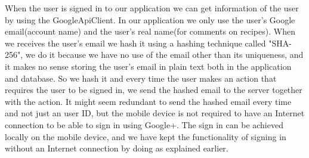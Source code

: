 When the user is signed in to our application we can get information of the user by using the GoogleApiClient.
In our application we only use the user's Google email(account name) and the user's real name(for comments on recipes). 
When we receives the user's email we hash it using a hashing technique called "SHA-256", we do it because we have no use of the email other than its uniqueness, and it makes no sense storing the user's email in plain text both in the application and database. 
So we hash it and every time the user makes an action that requires the user to be signed in, we send the hashed email to the server together with the action. 
It might seem redundant to send the hashed email every time and not just an user ID, but the mobile device is not required to have an Internet connection to be able to sign in using Google+. 
The sign in can be achieved locally on the mobile device, and we have kept the functionality of signing in without an Internet connection by doing as explained earlier.



